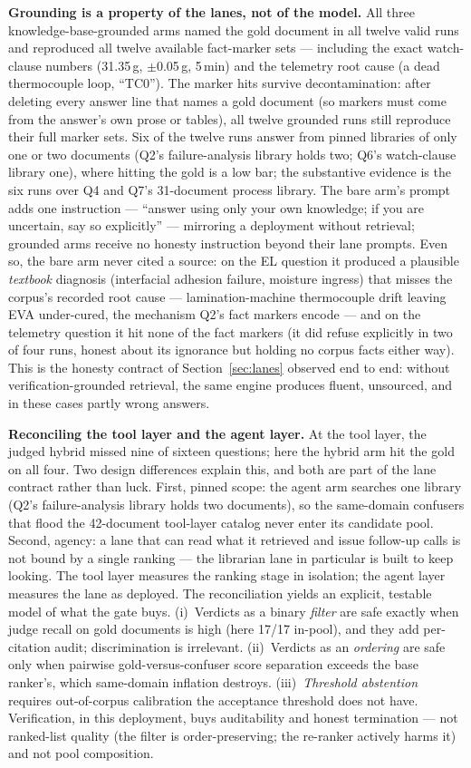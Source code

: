 \documentclass[preprint,12pt]{elsarticle}
\begin{document}
\textbf{Grounding is a property of the lanes, not of the model.} All three
knowledge-base-grounded arms named the gold document in all twelve valid
runs and reproduced all twelve available fact-marker sets --- including the
exact watch-clause numbers (31.35\,g, $\pm$0.05\,g, 5\,min) and the
telemetry root cause (a dead thermocouple loop, ``TC0''). The marker hits
survive decontamination: after deleting every answer line that names a
gold document (so markers must come from the answer's own prose or
tables), all twelve grounded runs still reproduce their full marker sets.
Six of the twelve runs answer from pinned libraries of only one or two
documents (Q2's failure-analysis library holds two; Q6's watch-clause
library one), where hitting the gold is a low bar; the substantive
evidence is the six runs over Q4 and Q7's 31-document process library.
The bare arm's prompt adds one instruction --- ``answer using only your
own knowledge; if you are uncertain, say so explicitly'' --- mirroring a
deployment without retrieval; grounded arms receive no honesty
instruction beyond their lane prompts. Even so, the bare arm
never cited a source: on the EL question it produced a plausible
\emph{textbook} diagnosis (interfacial adhesion failure, moisture ingress)
that misses the corpus's recorded root cause --- lamination-machine
thermocouple drift leaving EVA under-cured, the mechanism Q2's fact
markers encode --- and on the telemetry question it hit none of the fact
markers (it did refuse explicitly in two of four runs, honest about its
ignorance but holding no corpus facts either way).
This is the honesty contract of Section~\ref{sec:lanes} observed end to
end: without verification-grounded retrieval, the same engine produces
fluent, unsourced, and in these cases partly wrong answers.

\textbf{Reconciling the tool layer and the agent layer.} At the tool layer,
the judged hybrid missed nine of sixteen questions; here the hybrid arm hit
the gold on all four. Two design differences explain this, and both are
part of the lane contract rather than luck. First, pinned scope: the agent
arm searches one library (Q2's failure-analysis library holds two
documents), so the same-domain confusers that flood the 42-document
tool-layer catalog never enter its candidate pool. Second, agency: a lane
that can read what it retrieved and issue follow-up calls is not bound by a
single ranking --- the librarian lane in particular is built to keep
looking. The tool layer measures the ranking stage in isolation; the agent
layer measures the lane as deployed. The reconciliation yields an
explicit, testable model of what the gate buys. (i)~Verdicts as a binary
\emph{filter} are safe exactly when judge recall on gold documents is high
(here 17/17 in-pool), and they add per-citation audit; discrimination is
irrelevant. (ii)~Verdicts as an \emph{ordering} are safe only when
pairwise gold-versus-confuser score separation exceeds the base ranker's,
which same-domain inflation destroys. (iii)~\emph{Threshold abstention}
requires out-of-corpus calibration the acceptance threshold does not have.
Verification, in this deployment, buys auditability and honest termination
--- not ranked-list quality (the filter is order-preserving; the re-ranker
actively harms it) and not pool composition.
\end{document}
